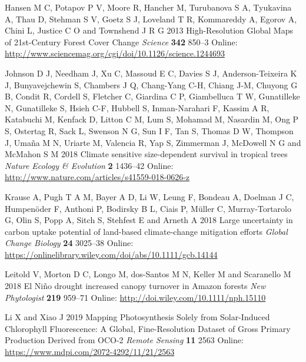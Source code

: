 \documentclass[
]{article}
\begin{document}
\leavevmode\hypertarget{ref-hansen_high-resolution_2013}{}%
Hansen M C, Potapov P V, Moore R, Hancher M, Turubanova S A, Tyukavina
A, Thau D, Stehman S V, Goetz S J, Loveland T R, Kommareddy A, Egorov A,
Chini L, Justice C O and Townshend J R G 2013 High-Resolution Global
Maps of 21st-Century Forest Cover Change \emph{Science} \textbf{342}
850--3 Online:
\url{http://www.sciencemag.org/cgi/doi/10.1126/science.1244693}

\leavevmode\hypertarget{ref-johnson_climate_2018}{}%
Johnson D J, Needham J, Xu C, Massoud E C, Davies S J, Anderson-Teixeira
K J, Bunyavejchewin S, Chambers J Q, Chang-Yang C-H, Chiang J-M, Chuyong
G B, Condit R, Cordell S, Fletcher C, Giardina C P, Giambelluca T W,
Gunatilleke N, Gunatilleke S, Hsieh C-F, Hubbell S, Inman-Narahari F,
Kassim A R, Katabuchi M, Kenfack D, Litton C M, Lum S, Mohamad M,
Nasardin M, Ong P S, Ostertag R, Sack L, Swenson N G, Sun I F, Tan S,
Thomas D W, Thompson J, Umaña M N, Uriarte M, Valencia R, Yap S,
Zimmerman J, McDowell N G and McMahon S M 2018 Climate sensitive
size-dependent survival in tropical trees \emph{Nature Ecology \&
Evolution} \textbf{2} 1436--42 Online:
\url{http://www.nature.com/articles/s41559-018-0626-z}

\leavevmode\hypertarget{ref-krause_large_2018}{}%
Krause A, Pugh T A M, Bayer A D, Li W, Leung F, Bondeau A, Doelman J C,
Humpenöder F, Anthoni P, Bodirsky B L, Ciais P, Müller C,
Murray‐Tortarolo G, Olin S, Popp A, Sitch S, Stehfest E and Arneth A
2018 Large uncertainty in carbon uptake potential of land-based
climate-change mitigation efforts \emph{Global Change Biology}
\textbf{24} 3025--38 Online:
\url{https://onlinelibrary.wiley.com/doi/abs/10.1111/gcb.14144}

\leavevmode\hypertarget{ref-leitold_nino_2018}{}%
Leitold V, Morton D C, Longo M, dos-Santos M N, Keller M and Scaranello
M 2018 El Niño drought increased canopy turnover in Amazon forests
\emph{New Phytologist} \textbf{219} 959--71 Online:
\url{http://doi.wiley.com/10.1111/nph.15110}

\leavevmode\hypertarget{ref-li_mapping_2019}{}%
Li X and Xiao J 2019 Mapping Photosynthesis Solely from Solar-Induced
Chlorophyll Fluorescence: A Global, Fine-Resolution Dataset of Gross
Primary Production Derived from OCO-2 \emph{Remote Sensing} \textbf{11}
2563 Online: \url{https://www.mdpi.com/2072-4292/11/21/2563}
\end{document}
